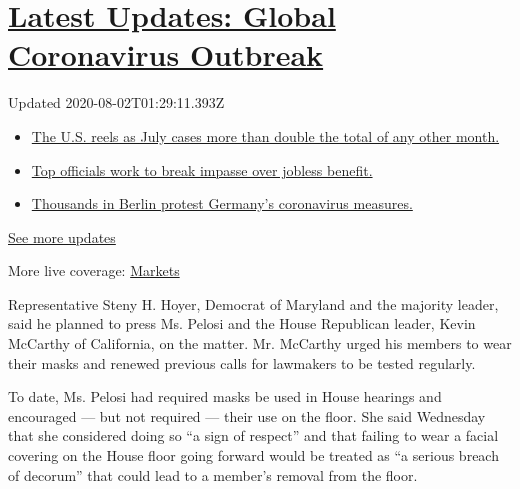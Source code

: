 \hypertarget{latest-updates-global-coronavirus-outbreak}{%
\section{\texorpdfstring{\href{https://www.nytimes.com/2020/08/01/world/coronavirus-covid-19.html?action=click\&pgtype=Article\&state=default\&region=MAIN_CONTENT_1\&context=storylines_live_updates}{Latest
Updates: Global Coronavirus
Outbreak}}{Latest Updates: Global Coronavirus Outbreak}}\label{latest-updates-global-coronavirus-outbreak}}

Updated 2020-08-02T01:29:11.393Z

\begin{itemize}
\tightlist
\item
  \href{https://www.nytimes.com/2020/08/01/world/coronavirus-covid-19.html?action=click\&pgtype=Article\&state=default\&region=MAIN_CONTENT_1\&context=storylines_live_updates\#link-34047410}{The
  U.S. reels as July cases more than double the total of any other
  month.}
\item
  \href{https://www.nytimes.com/2020/08/01/world/coronavirus-covid-19.html?action=click\&pgtype=Article\&state=default\&region=MAIN_CONTENT_1\&context=storylines_live_updates\#link-3ac56579}{Top
  officials work to break impasse over jobless benefit.}
\item
  \href{https://www.nytimes.com/2020/08/01/world/coronavirus-covid-19.html?action=click\&pgtype=Article\&state=default\&region=MAIN_CONTENT_1\&context=storylines_live_updates\#link-25930521}{Thousands
  in Berlin protest Germany's coronavirus measures.}
\end{itemize}

\href{https://www.nytimes.com/2020/08/01/world/coronavirus-covid-19.html?action=click\&pgtype=Article\&state=default\&region=MAIN_CONTENT_1\&context=storylines_live_updates}{See
more updates}

More live coverage:
\href{https://www.nytimes.com/live/2020/07/31/business/stock-market-today-coronavirus?action=click\&pgtype=Article\&state=default\&region=MAIN_CONTENT_1\&context=storylines_live_updates}{Markets}

Representative Steny H. Hoyer, Democrat of Maryland and the majority
leader, said he planned to press Ms. Pelosi and the House Republican
leader, Kevin McCarthy of California, on the matter. Mr. McCarthy urged
his members to wear their masks and renewed previous calls for lawmakers
to be tested regularly.

To date, Ms. Pelosi had required masks be used in House hearings and
encouraged --- but not required --- their use on the floor. She said
Wednesday that she considered doing so ``a sign of respect'' and that
failing to wear a facial covering on the House floor going forward would
be treated as ``a serious breach of decorum'' that could lead to a
member's removal from the floor.


